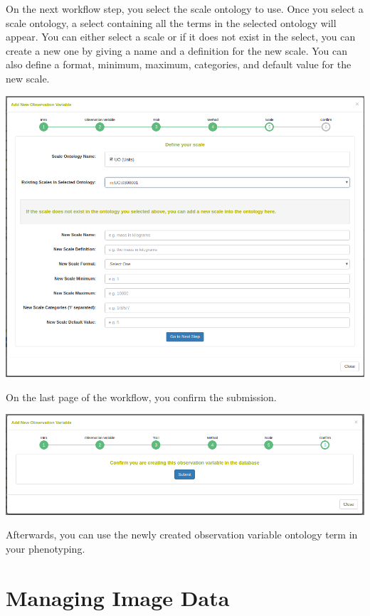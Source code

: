 \documentclass[
  12pt,
]{book}
\begin{document}
On the next workflow step, you select the scale ontology to use. Once you select a scale ontology, a select containing all the terms in the selected ontology will appear. You can either select a scale or if it does not exist in the select, you can create a new one by giving a name and a definition for the new scale. You can also define a format, minimum, maximum, categories, and default value for the new scale.

\begin{center}\includegraphics[width=0.95\linewidth]{assets/images/manage_observation_variables_workflow_scale} \end{center}

On the last page of the workflow, you confirm the submission.

\begin{center}\includegraphics[width=0.95\linewidth]{assets/images/manage_observation_variables_workflow_submit} \end{center}

Afterwards, you can use the newly created observation variable ontology term in your phenotyping.

\hypertarget{managing-image-data}{%
\chapter{Managing Image Data}\label{managing-image-data}}
\end{document}
